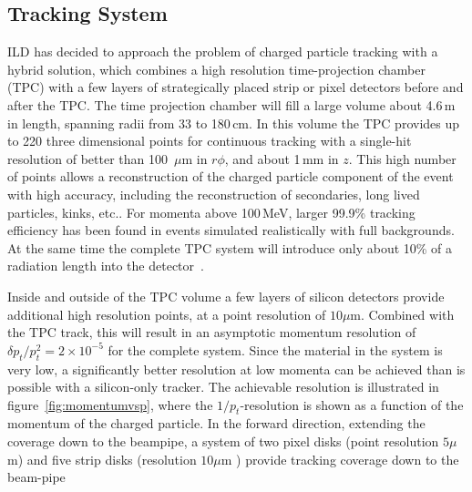 \documentclass[%
 amsmath,amssymb,
 aps,
 longbibliography,
]{revtex4-1}
\begin{document}
\subsection{Tracking System}

 ILD has decided to approach the problem of charged particle tracking with a hybrid solution, which combines a high resolution time-projection chamber (TPC) with a few layers of strategically placed strip or pixel detectors before and after the TPC. 
The time projection chamber will fill a large volume about 4.6\,m in length, spanning radii from 33 to 180\,cm. In this volume the TPC provides up to 220 three dimensional points for continuous tracking with a single-hit resolution of better than 100~$\mu\mathrm{m}$ in $r \phi$, and about 1\,mm in $z$. This high number of points allows a reconstruction of the charged particle component of the event with high accuracy, including the reconstruction of secondaries, long lived particles, kinks, etc.. For momenta above 100\,MeV, larger 99.9\% tracking efficiency has been found in events simulated realistically with full backgrounds. At the same time the complete TPC system will introduce only about 10\% of a radiation length into the detector~\cite{Diener:2012mc}. 

Inside and outside of the TPC volume a few layers of silicon detectors provide additional high resolution points, at a point resolution of $10\mu \mathrm{m}$. Combined with the TPC track, this will result in an asymptotic momentum resolution of $\delta p_t / p_t^2 = 2 \times 10^{-5}$ for the complete system. Since the material in the system is very low, a significantly better resolution at low momenta can be achieved than is possible with a silicon-only tracker. The achievable resolution is illustrated in figure~\ref{fig:momentumvsp}, where the $1/p_t$-resolution is shown as a function of the momentum of the charged particle. In the forward direction, extending the coverage down to the beampipe, a system of two pixel disks (point resolution $5 \mu$m) and five strip disks (resolution $10 \mu$m ) provide tracking coverage down to the beam-pipe 
\end{document}
